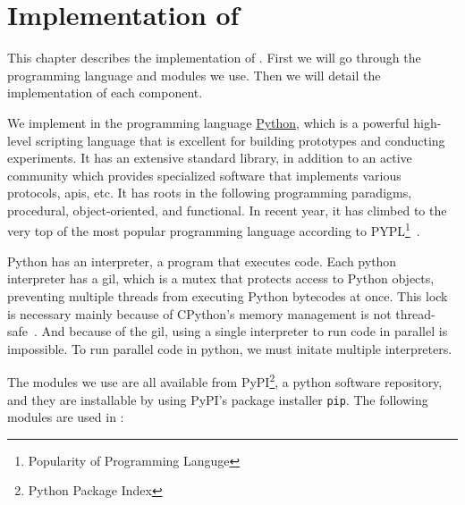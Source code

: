 
\chapter{Implementation of \project}\label{ch:implementation}\glsresetall
This chapter describes the implementation of \project. First we will go through the programming language and modules we use. Then we will detail the implementation of each component.

We implement \project in the programming language \href{https://www.python.org/}{Python}, which is a powerful high-level scripting language that is excellent for building prototypes and conducting experiments. It has an extensive standard library, in addition to an active community which provides specialized software that implements various protocols, \acp{api}, etc. It has roots in the following programming paradigms, procedural, object-oriented, and functional. In recent year, it has climbed to the very top of the most popular programming language according to PYPL\footnote{Popularity of Programming Languge}~\cite{pypl_python}.

Python has an interpreter, a program that executes code. Each python interpreter has a \ac{gil}, which is a mutex that protects access to Python objects, preventing multiple threads from executing Python bytecodes at once. This lock is necessary mainly because of CPython's memory management is not thread-safe~\cite{python_gil}. And because of the \ac{gil}, using a single interpreter to run code in parallel is impossible. To run parallel code in python, we must initate multiple interpreters.

The modules we use are all available from PyPI\footnote{Python Package Index}, a python software repository, and they are installable by using PyPI's package installer \texttt{pip}. The following modules are used in \project:

